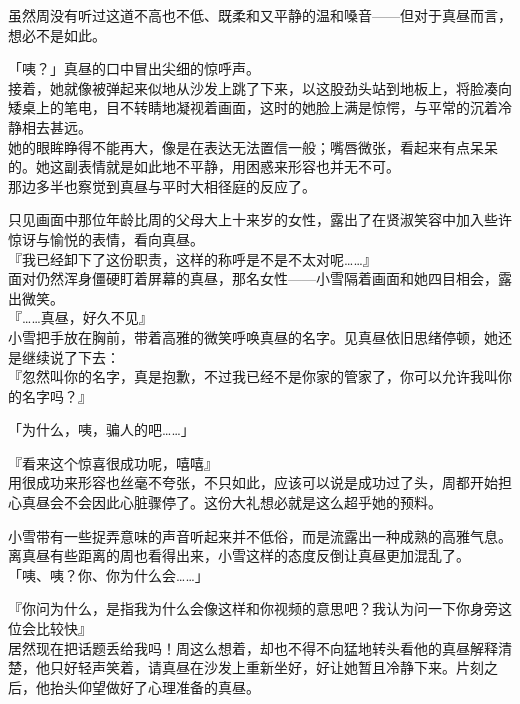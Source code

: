 虽然周没有听过这道不高也不低、既柔和又平静的温和嗓音——但对于真昼而言，想必不是如此。

「咦？」真昼的口中冒出尖细的惊呼声。\\

接着，她就像被弹起来似地从沙发上跳了下来，以这股劲头站到地板上，将脸凑向矮桌上的笔电，目不转睛地凝视着画面，这时的她脸上满是惊愕，与平常的沉着冷静相去甚远。\\

她的眼眸睁得不能再大，像是在表达无法置信一般；嘴唇微张，看起来有点呆呆的。她这副表情就是如此地不平静，用困惑来形容也并无不可。\\

那边多半也察觉到真昼与平时大相径庭的反应了。

只见画面中那位年龄比周的父母大上十来岁的女性，露出了在贤淑笑容中加入些许惊讶与愉悦的表情，看向真昼。\\

『我已经卸下了这份职责，这样的称呼是不是不太对呢……』\\

面对仍然浑身僵硬盯着屏幕的真昼，那名女性——小雪隔着画面和她四目相会，露出微笑。\\

『……真昼，好久不见』\\

小雪把手放在胸前，带着高雅的微笑呼唤真昼的名字。见真昼依旧思绪停顿，她还是继续说了下去：\\

『忽然叫你的名字，真是抱歉，不过我已经不是你家的管家了，你可以允许我叫你的名字吗？』

「为什么，咦，骗人的吧……」

『看来这个惊喜很成功呢，嘻嘻』\\

用很成功来形容也丝毫不夸张，不只如此，应该可以说是成功过了头，周都开始担心真昼会不会因此心脏骤停了。这份大礼想必就是这么超乎她的预料。

小雪带有一些捉弄意味的声音听起来并不低俗，而是流露出一种成熟的高雅气息。离真昼有些距离的周也看得出来，小雪这样的态度反倒让真昼更加混乱了。\\

「咦、咦？你、你为什么会……」

『你问为什么，是指我为什么会像这样和你视频的意思吧？我认为问一下你身旁这位会比较快』\\

居然现在把话题丢给我吗！周这么想着，却也不得不向猛地转头看他的真昼解释清楚，他只好轻声笑着，请真昼在沙发上重新坐好，好让她暂且冷静下来。片刻之后，他抬头仰望做好了心理准备的真昼。\\


